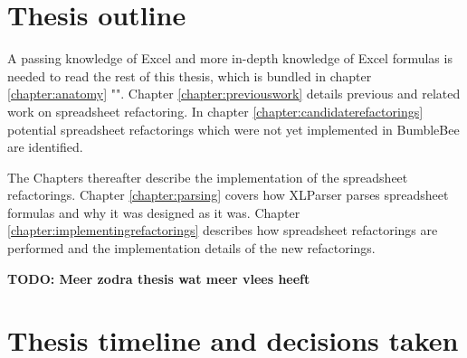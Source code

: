\documentclass[12pt,a4paper,onecolumn,oneside,parskip]{memoir}
\newcommand{\todo}[1]{\textbf{TODO: #1}}
\begin{document}
\section{Thesis outline}

A passing knowledge of Excel and more in-depth knowledge of Excel formulas is needed to read the rest of this thesis, which is bundled in chapter \ref{chapter:anatomy} "".
Chapter \ref{chapter:previouswork} details previous and related work on spreadsheet refactoring.
In chapter \ref{chapter:candidaterefactorings} potential spreadsheet refactorings which were not yet implemented in BumbleBee are identified.

The Chapters thereafter describe the implementation of the spreadsheet refactorings.
Chapter \ref{chapter:parsing} covers how XLParser parses spreadsheet formulas and why it was designed as it was.
Chapter \ref{chapter:implementingrefactorings} describes how spreadsheet refactorings are performed and the implementation details of the new refactorings.

\todo{Meer zodra thesis wat meer vlees heeft}

\clearpage
\section{Thesis timeline and decisions taken}
\end{document}
